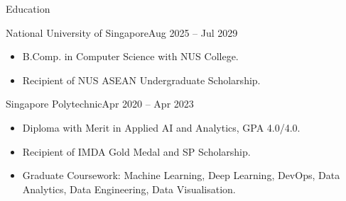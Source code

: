 \documentclass[]{mcdowellcv}
\begin{document}
	\begin{cvsection}{Education}
		
		\begin{cvsubsection}{National University of Singapore}{}{Aug 2025 -- Jul 2029}
			\begin{itemize}
				
				\item B.Comp. in Computer Science with NUS College.
				
				\item Recipient of NUS ASEAN Undergraduate Scholarship.
				
			\end{itemize}
		\end{cvsubsection}
		
		\begin{cvsubsection}{Singapore Polytechnic}{}{Apr 2020 -- Apr 2023}
			\begin{itemize}
				
				\item Diploma with Merit in Applied AI and Analytics, GPA 4.0/4.0.
				
				\item Recipient of IMDA Gold Medal and SP Scholarship.
				
				\item Graduate Coursework: Machine Learning, Deep Learning, DevOps, Data Analytics, Data Engineering, Data Visualisation.
				
			\end{itemize}
		\end{cvsubsection}
		 
	\end{cvsection}
		
\end{document}
